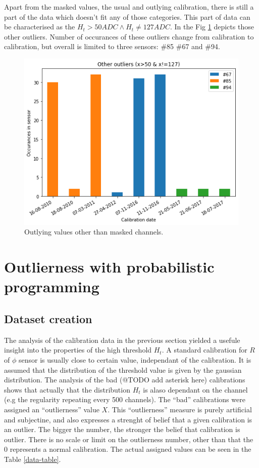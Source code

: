 Apart from the masked values, the usual and outlying calibration, there is still a part of the data which doesn't fit any of those categories.
This part of data can be characterised as the $H_{t} > 50 ADC \land H_{t} \neq 127 ADC$.
In the Fig \ref{plot:p3-other-outliers} depicts those other outliers. Number of occurances of these outliers change from calibration to calibration, but overall is limited to three sensors: \#85 \#67 and \#94.


\begin{figure}
    \centering
    \includegraphics[width=0.7\linewidth]{figures/chapter4/calib_analysis/P3-other-outliers.png}
    \caption{Outlying values other than masked channels.}
    \label{plot:p3-other-outliers}
  \end{figure}

\section{Outlierness with probabilistic programming}
\label{chap4:outlierness}

\subsection{Dataset creation}
The analysis of the calibration data in the previous section yielded a usefule insight into the properties of the high threshold $H_t$.
A standard calibration for $R$ of $\phi$ sensor is usually close to certain value, independant of the calibration.
It is assumed that the distribution of the threshold value is given by the gaussian distribution.
The analysis of the bad (@TODO add asterisk here) calibrations shows that actually that the distribution $H_t$ is alaso dependant on the channel (e.g the regularity repeating every 500 channels).
The ``bad'' calibrations were assigned an ``outlierness'' value $X$.
This ``outlierness'' measure is purely artificial and subjectine, and also expresses a strenght of belief that a given calibration is an outlier.
The bigger the number, the stronger the belief that calibration is outlier.
There is no scale or limit on the outlierness number, other than that the 0 represents a normal calibration.
The actual assigned values can be seen in the Table \ref{data-table}.


